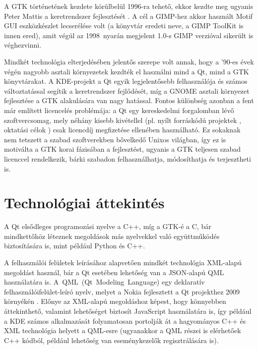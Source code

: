 A GTK történetének kezdete körülbelül 1996-ra tehető, ekkor kezdte meg ugyanis Peter Mattis a keretrendszer fejlesztését \cite{GtkWiki}. A cél a GIMP-hez akkor használt Motif GUI eszközkészlet lecserélése volt (a könyvtár eredeti neve, a GIMP ToolKit is innen ered), amit végül az 1998~nyarán megjelent 1.0-s GIMP verzióval sikerült is véghezvinni.

Mindkét technológia elterjedésében jelentős szerepe volt annak, hogy a '90-es évek végén nagyobb asztali környezetek kezdték el használni mind a Qt, mind a GTK könyvtárakat. A KDE-projekt a Qt egyik legjelentősebb felhasználója és számos változtatással segítik a keretrendszer fejlődését, míg a GNOME asztali környezet fejlesztése a GTK alakulására van nagy hatással. Fontos különbség azonban a fent már említett licencelés problémája: a Qt egy kereskedelmi forgalomban lévő szoftvercsomag, mely néhány kisebb kivétellel (pl. nyílt forráskódú projektek \cite{QtOpenSource}, oktatási célok \cite{QtEdu}) csak licencdíj megfizetése ellenében használható. Ez sokaknak nem tetszett a szabad szoftverekben bővelkedő Unixos világban, így ez is motiválta a GTK korai fázisában a fejlesztést, ugyanis a GTK teljesen szabad licenccel rendelkezik, bárki szabadon felhasználhatja, módosíthatja és terjesztheti is.

\section{Technológiai áttekintés}
A Qt elsődleges programozási nyelve a C++, míg a GTK-é a C, bár mindkettőhöz léteznek megoldások más nyelvekkel való együttműködés biztosítására is, mint például Python és C++.

A felhasználói felületek leírásához alapvetően mindkét technológia XML-alapú megoldást használ, bár a Qt esetében lehetőség van a JSON-alapú QML használatára is. A~QML~(Qt~Modeling~Language) egy deklaratív felhasználóifelület-leíró nyelv, melyet a Nokia fejlesztett a Qt projekthez 2009 környékén \cite{QmlWiki}. Előnye az XML-alapú megoldáshoz képest, hogy könnyebben áttekinthető, valamint lehetőséget biztosít JavaScript használatára is, így például a KDE számos alkalmazását folyamatosan portolják át a hagyományos C++ és XML technológia helyett a QML-esre (ugyanakkor a QML részei is elérhetőek C++ kódból, például lehetőség van eseménykezelők regisztrálására is).

